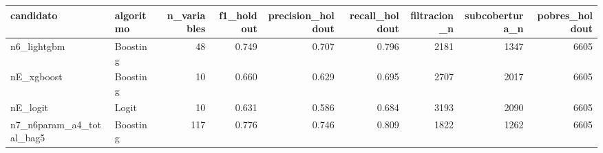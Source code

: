 
\begin{tabular}{llrrrrrrr}
\toprule
candidato & algoritmo & n\_variables & f1\_holdout & precision\_holdout & recall\_holdout & filtracion\_n & subcobertura\_n & pobres\_holdout\\
\midrule
n6\_lightgbm & Boosting & 48 & 0.749 & 0.707 & 0.796 & 2181 & 1347 & 6605\\
nE\_xgboost & Boosting & 10 & 0.660 & 0.629 & 0.695 & 2707 & 2017 & 6605\\
nE\_logit & Logit & 10 & 0.631 & 0.586 & 0.684 & 3193 & 2090 & 6605\\
n7\_n6param\_a4\_total\_bag5 & Boosting & 117 & 0.776 & 0.746 & 0.809 & 1822 & 1262 & 6605\\
\bottomrule
\end{tabular}
